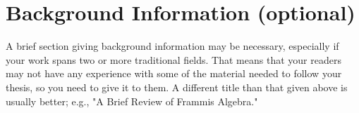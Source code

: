 \chapter{Background Information (optional)}
\label{sec:BackgroundInformation}

A brief section giving background information may be necessary, especially if
your work spans two or more traditional fields. That means that your readers may
not have any experience with some of the material needed to follow your thesis,
so you need to give it to them. A different title than that given above is
usually better; e.g., "A Brief Review of Frammis Algebra."